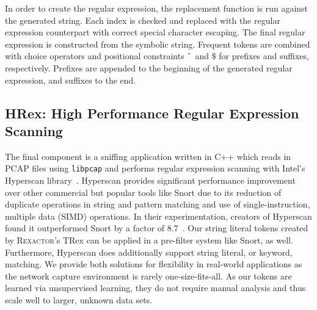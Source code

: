 In order to create the regular expression, the replacement function is run against the generated string. Each index is checked and replaced with the regular expression counterpart with correct special character escaping. The final regular expression is constructed from the symbolic string. Frequent tokens are combined with choice operators and positional constraints $\string^$ and $\$$ for prefixes and suffixes, respectively. Prefixes are appended to the beginning of the generated regular expression, and suffixes to the end.

\subsection{HRex: High Performance Regular Expression Scanning}
The final component is a sniffing application written in C++ which reads in PCAP files using \texttt{libpcap} and performs regular expression scanning with Intel's Hyperscan library~\cite{hyperscan}. Hyperscan provides significant performance improvement over other commercial but popular tools like Snort due to its reduction of duplicate operations in string and pattern matching and use of single-instruction, multiple data (SIMD) operations. In their experimentation, creators of Hyperscan found it outperformed Snort by a factor of 8.7~\cite{hyperscanusinex}. Our string literal tokens created by \textsc{Rexactor}'s TRex can be applied in a pre-filter system like Snort, as well. Furthermore, Hyperscan does additionally support string literal, or keyword, matching. We provide both solutions for flexibility in real-world applications as the network capture environment is rarely one-size-fits-all. As our tokens are learned via unsupervised learning, they do not require manual analysis and thus scale well to larger, unknown data sets.
